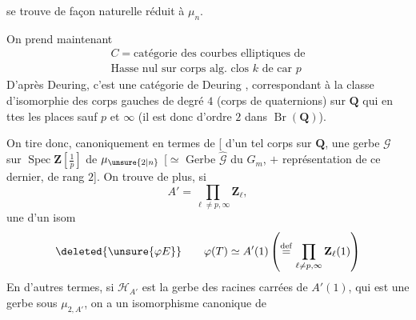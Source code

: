 

se trouve de façon naturelle réduit à $\mu_n$.

On prend maintenant
\[
\begin{gathered}
C=\text{catégorie des courbes elliptiques de}\\
\text{Hasse nul sur corps alg. clos $k$ de car $p$}
\end{gathered}
\]
D'après Deuring, c'est une catégorie de Deuring ,  correspondant à la classe d'isomorphie des corps gauches de degré $4$ (corps de quaternions) sur $\mathbf Q$  qui  en ttes les places sauf $p$ et $\infty$ (il est donc d'ordre $2$ dans $\operatorname{Br}(\mathbf Q)$).

On tire donc, canoniquement en  termes de  [  d'un tel corps sur $\mathbf Q$, une gerbe $\mathcal G$ sur $\operatorname{Spec}\mathbf Z[\frac1p]$ de   $\mu_{\unsure{2|n}}$ [$\simeq$ Gerbe $\widehat{\mathcal G}$ du  $G_m$, $+$ représentation  de ce dernier, de rang $2$]. On trouve de plus, si
\[
A'=\prod_{\ell\ne p,\infty}\mathbf Z_\ell,
\]
une 
 d'un isom
\[
\deleted{\unsure{\varphi E}}\qquad
\varphi(T)\simeq A'(1)\left(\overset{\mathrm{def}}=\prod_{\ell\ne p,\infty}\mathbf Z_\ell(1)\right)
\]
En d'autres termes, si $\mathcal H_{A'}$ est la gerbe des racines carrées de $A'(1)$, qui est une gerbe sous $\mu_{2,A'}$, on a un isomorphisme canonique de



